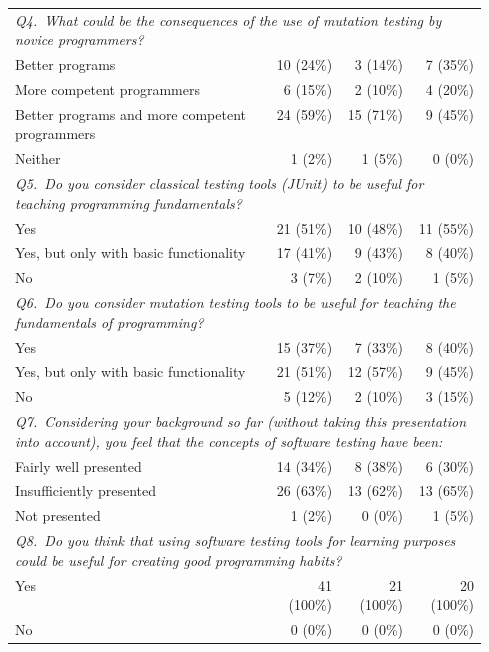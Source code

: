 {\begin{longtable}{m{0.55\linewidth}rrr}
    \multicolumn{4}{m{0.9\linewidth}}{\textit{Q4.~What could be the consequences of the use of mutation testing by novice programmers?}} \\*    Better programs & 10 (24\%) & 3 (14\%) & 7 (35\%) \\*
    More competent programmers & 6 (15\%) & 2 (10\%) & 4 (20\%) \\*
    Better programs and more competent programmers & 24 (59\%) & 15 (71\%) & 9 (45\%) \\*
    Neither & 1 (2\%) & 1 (5\%) & 0 (0\%) \\ \hline

    \multicolumn{4}{m{0.9\linewidth}}{\textit{Q5.~Do you consider classical testing tools (JUnit) to be useful for teaching programming fundamentals?}} \\*    Yes & 21 (51\%) & 10 (48\%) & 11 (55\%) \\*
    Yes, but only with basic functionality & 17 (41\%) & 9 (43\%) & 8 (40\%) \\*
    No & 3 (7\%) & 2 (10\%) & 1 (5\%) \\ \hline

    \multicolumn{4}{m{0.9\linewidth}}{\textit{Q6.~Do you consider mutation testing tools to be useful for teaching the fundamentals of programming?}} \\*    Yes & 15 (37\%) & 7 (33\%) & 8 (40\%) \\*
    Yes, but only with basic functionality & 21 (51\%) & 12 (57\%) & 9 (45\%) \\*
    No & 5 (12\%) & 2 (10\%) & 3 (15\%) \\ \hline

    \multicolumn{4}{m{0.9\linewidth}}{\textit{Q7.~Considering your background so far (without taking this presentation into account), you feel that the concepts of software testing have been:}} \\*    Fairly well presented & 14 (34\%) & 8 (38\%) & 6 (30\%) \\*
    Insufficiently presented & 26 (63\%) & 13 (62\%) & 13 (65\%) \\*
    Not presented & 1 (2\%) & 0 (0\%) & 1 (5\%) \\ \hline

    \multicolumn{4}{m{0.9\linewidth}}{\textit{Q8.~Do you think that using software testing tools for learning purposes could be useful for creating good programming habits?}} \\*    Yes & 41 (100\%) & 21 (100\%) & 20 (100\%) \\*
    No & 0 (0\%) & 0 (0\%) & 0 (0\%) \\ \hline


\end{longtable}}

